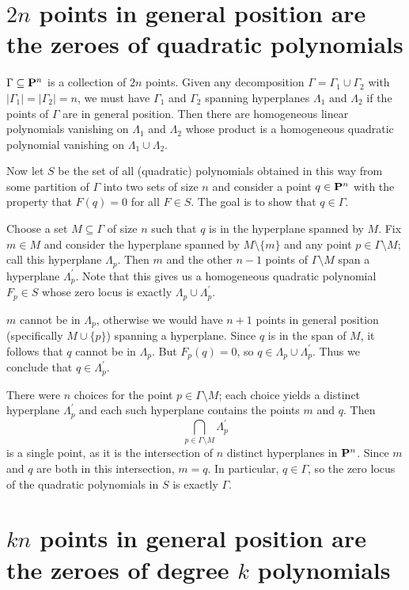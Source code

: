 

\section{$2n$ points in general position are the zeroes of quadratic polynomials}

$\Gamma\subseteq\P^n$ is a collection of $2n$ points. Given any decomposition $\Gamma=\Gamma_1\cup\Gamma_2$ with $|\Gamma_1|=|\Gamma_2|=n$, we must have $\Gamma_1$ and $\Gamma_2$ spanning hyperplanes $\Lambda_1$ and $\Lambda_2$ if the points of $\Gamma$ are in general position. Then there are homogeneous linear polynomials vanishing on $\Lambda_1$ and $\Lambda_2$ whose product is a homogeneous quadratic polynomial vanishing on $\Lambda_1\cup\Lambda_2$.

Now let $S$ be the set of all (quadratic) polynomials obtained in this way from some partition of $\Gamma$ into two sets of size $n$ and consider a point $q\in\P^n$ with the property that $F(q)=0$ for all $F\in S$. The goal is to show that $q\in\Gamma$.

Choose a set $M\subseteq\Gamma$ of size $n$ such that $q$ is in the hyperplane spanned by $M$. Fix $m\in M$ and consider the hyperplane spanned by $M\setminus\{m\}$ and any point $p\in\Gamma\setminus M$; call this hyperplane $\Lambda_p$. Then $m$ and the other $n-1$ points of $\Gamma\setminus M$ span a hyperplane $\Lambda_p^\prime$. Note that this gives us a homogeneous quadratic polynomial $F_p\in S$ whose zero locus is exactly $\Lambda_p\cup\Lambda_p^\prime$.

$m$ cannot be in $\Lambda_p$, otherwise we would have $n+1$ points in general position (specifically $M\cup\{p\}$) spanning a hyperplane. Since $q$ is in the span of $M$, it follows that $q$ cannot be in $\Lambda_p$. But $F_p(q)=0$, so $q\in \Lambda_p\cup\Lambda_p^\prime$. Thus we conclude that $q\in\Lambda_p^\prime$.

There were $n$ choices for the point $p\in\Gamma\setminus M$; each choice yields a distinct hyperplane $\Lambda_p^\prime$ and each such hyperplane contains the points $m$ and $q$. Then
\[
\bigcap_{p\in\Gamma\setminus M}\Lambda_p^\prime
\]
is a single point, as it is the intersection of $n$ distinct hyperplanes in $\P^n$. Since $m$ and $q$ are both in this intersection, $m=q$. In particular, $q\in\Gamma$, so the zero locus of the quadratic polynomials in $S$ is exactly $\Gamma$.

\section{$kn$ points in general position are the zeroes of degree $k$ polynomials}

